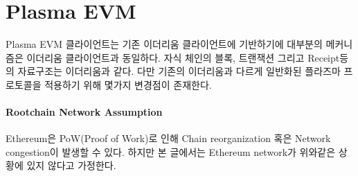 \documentclass[letterpaper, 11pt]{article}
\begin{document}
\section{Plasma EVM} \label{sec:childchain}
\begin{CJK}{UTF8}{mj}
Plasma EVM 클라이언트는 기존 이더리움 클라이언트에 기반하기에 대부분의 메커니즘은 이더리움 클라이언트과 동일하다. 자식 체인의 블록, 트랜잭션 그리고 Receipt등의 자료구조는 이더리움과 같다. 다만 기존의 이더리움과 다르게 일반화된 플라즈마 프로토콜을 적용하기 위해 몇가지 변경점이 존재한다.
\end{CJK}

\paragraph{Rootchain Network Assumption} \begin{CJK}{UTF8}{mj}
Ethereum은 PoW(Proof of Work)로 인해 Chain reorganization 혹은 Network congestion이 발생할 수 있다. 하지만 본 글에서는 Ethereum network가 위와같은 상황에 있지 않다고 가정한다.
\end{CJK}
\end{document}
